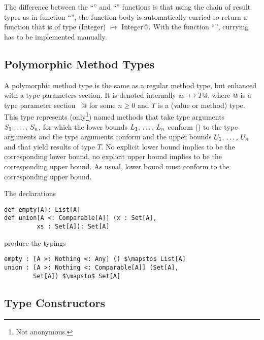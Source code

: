 The difference between the ``'' and ``'' functions is that using the chain of result types as in function ``'', the function body is automatically curried to return a function that is of type \lstinline@(Integer) $\mapsto$ Integer@. With the function ``'', currying has to be implemented manually. 






\subsection{Polymorphic Method Types}
\label{sec:polymorphic-method-types}

A polymorphic method type is the same as a regular method type, but enhanced with a type parameters section. It is denoted internally as \lstinline@[$\tps$]$ \mapsto T$@, where \lstinline@[$\tps$]@ is a type parameter section ~\lstinline@[$\pm a_1$ >: $L_1$ <: $U_1$ $\commadots$ $\pm a_n$ >: $L_n$ <: $U_n$]@ for some $n \geq 0$ and $T$ is a (value or method) type. This type represents (only\footnote{Not anonymous.}) named methods that take type arguments $S_1 ,\, \ldots ,\, S_n$, for which the lower bounds $L_1 ,\, \ldots ,\, L_n$ conform () to the type arguments and the type arguments conform and the upper bounds $U_1 ,\, \ldots ,\, U_n$ and that yield results of type $T$. No explicit lower bound implies  to be the corresponding lower bound, no explicit upper bound implies  to be the corresponding upper bound. As usual, lower bound must conform to the corresponding upper bound. 

\example The declarations
\begin{lstlisting}[escapechar=@,deletekeywords={union}]
def empty[A]: List[A]
def union[A <: Comparable[A]] (x : Set[A], 
         xs : Set[A]): Set[A]
\end{lstlisting}
produce the typings
\begin{lstlisting}[escapechar=@,deletekeywords={union}]
empty : [A >: Nothing <: Any] () $\mapsto$ List[A]
union : [A >: Nothing <: Comparable[A]] (Set[A], 
        Set[A]) $\mapsto$ Set[A]
\end{lstlisting}






\subsection{Type Constructors}
\label{sec:type-constructors}

